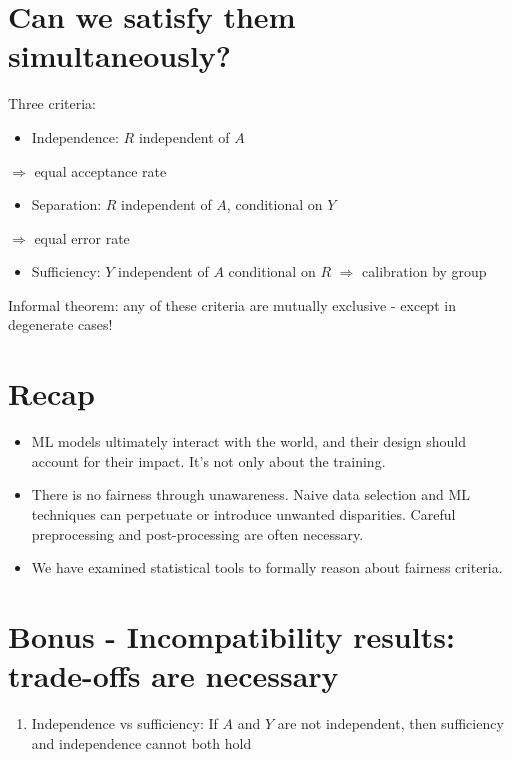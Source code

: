 \documentclass[10pt]{article}
\begin{document}
\section*{Can we satisfy them simultaneously?}
Three criteria:

\begin{itemize}
  \item Independence: $R$ independent of $A$
\end{itemize}

$\Longrightarrow$ equal acceptance rate

\begin{itemize}
  \item Separation: $R$ independent of $A$, conditional on $Y$
\end{itemize}

$\Longrightarrow$ equal error rate

\begin{itemize}
  \item Sufficiency: $Y$ independent of $A$ conditional on $R$ $\Longrightarrow$ calibration by group
\end{itemize}

Informal theorem: any of these criteria are mutually exclusive - except in degenerate cases!

\section*{Recap}
\begin{itemize}
  \item ML models ultimately interact with the world, and their design should account for their impact. It's not only about the training.

  \item There is no fairness through unawareness. Naive data selection and ML techniques can perpetuate or introduce unwanted disparities. Careful preprocessing and post-processing are often necessary.

  \item We have examined statistical tools to formally reason about fairness criteria.

\end{itemize}

\section*{Bonus - Incompatibility results: trade-offs are necessary}
\begin{enumerate}
  \item Independence vs sufficiency: If $A$ and $Y$ are not independent, then sufficiency and independence cannot both hold
\end{enumerate}
\end{document}
